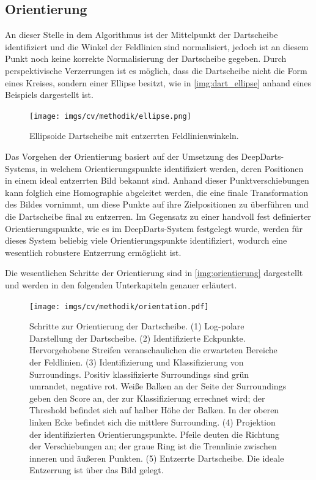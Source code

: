 \subsection{Orientierung}
\label{sec:orientierung}

An dieser Stelle in dem Algorithmus ist der Mittelpunkt der Dartscheibe identifiziert und die Winkel der Feldlinien sind normalisiert, jedoch ist an diesem Punkt noch keine korrekte Normalisierung der Dartscheibe gegeben. Durch perspektivische Verzerrungen ist es möglich, dass die Dartscheibe nicht die Form eines Kreises, sondern einer Ellipse besitzt, wie in \autoref{img:dart_ellipse} anhand eines Beispiels dargestellt ist.

\begin{figure}
    \centering
    \texttt{[image: imgs/cv/methodik/ellipse.png]}
    \caption{Ellipsoide Dartscheibe mit entzerrten Feldlinienwinkeln.}
    \label{img:dart_ellipse}
\end{figure}

Das Vorgehen der Orientierung basiert auf der Umsetzung des DeepDarts-Systems, in welchem Orientierungspunkte identifiziert werden, deren Positionen in einem ideal entzerrten Bild bekannt sind. Anhand dieser Punktverschiebungen kann folglich eine Homographie abgeleitet werden, die eine finale Transformation des Bildes vornimmt, um diese Punkte auf ihre Zielpositionen zu überführen und die Dartscheibe final zu entzerren. Im Gegensatz zu einer handvoll fest definierter Orientierungspunkte, wie es im DeepDarts-System festgelegt wurde, werden für dieses System beliebig viele Orientierungspunkte identifiziert, wodurch eine wesentlich robustere Entzerrung ermöglicht ist.

Die wesentlichen Schritte der Orientierung sind in \autoref{img:orientierung} dargestellt und werden in den folgenden Unterkapiteln genauer erläutert.

\begin{figure}
    \centering
    \texttt{[image: imgs/cv/methodik/orientation.pdf]}
    \caption{Schritte zur Orientierung der Dartscheibe. (1) Log-polare Darstellung der Dartscheibe. (2) Identifizierte Eckpunkte. Hervorgehobene Streifen veranschaulichen die erwarteten Bereiche der Feldlinien. (3) Identifizierung und Klassifizierung von Surroundings. Positiv klassifizierte Surroundings sind grün umrandet, negative rot. Weiße Balken an der Seite der Surroundings geben den Score an, der zur Klassifizierung errechnet wird; der Threshold befindet sich auf halber Höhe der Balken. In der oberen linken Ecke befindet sich die mittlere Surrounding. (4) Projektion der identifizierten Orientierungspunkte. Pfeile deuten die Richtung der Verschiebungen an; der graue Ring ist die Trennlinie zwischen inneren und äußeren Punkten. (5) Entzerrte Dartscheibe. Die ideale Entzerrung ist über das Bild gelegt.}
    \label{img:orientierung}
\end{figure}

